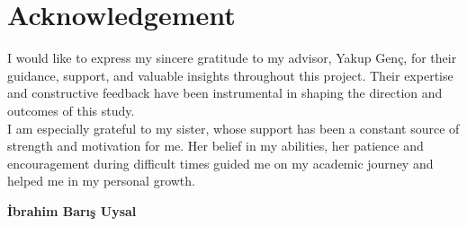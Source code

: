 \chapter*{Acknowledgement}

I would like to express my sincere gratitude to my advisor, Yakup Genç, for their guidance, support, and valuable insights throughout this project. Their expertise and constructive feedback have been instrumental in shaping the direction and outcomes of this study. \\
I am especially grateful to my sister, whose support has been a constant source of strength and motivation for me. Her belief in my abilities, her patience and encouragement during difficult times guided me on my academic journey and helped me in my personal growth.
\vspace{1cm}
\begin{flushright}
\textbf{İbrahim Barış Uysal} %
\end{flushright}
\clearpage